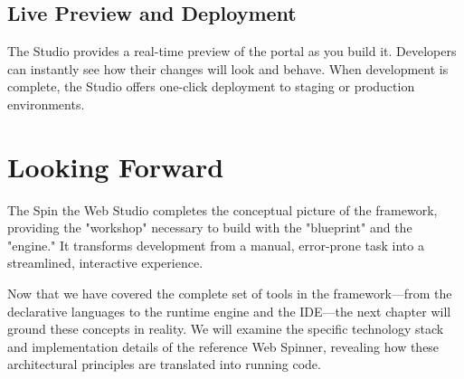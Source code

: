 \subsection{Live Preview and Deployment}
The Studio provides a real-time preview of the portal as you build it. Developers can instantly see how their changes will look and behave. When development is complete, the Studio offers one-click deployment to staging or production environments.

\section{Looking Forward}
\label{sec:studio-forward}

The Spin the Web Studio completes the conceptual picture of the framework, providing the "workshop" necessary to build with the "blueprint" and the "engine." It transforms \webbase{} development from a manual, error-prone task into a streamlined, interactive experience.

Now that we have covered the complete set of tools in the framework—from the declarative languages to the runtime engine and the IDE—the next chapter will ground these concepts in reality. We will examine the specific technology stack and implementation details of the reference Web Spinner, revealing how these architectural principles are translated into running code.
